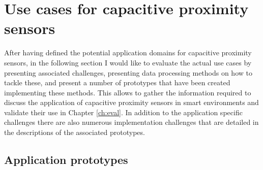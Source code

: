 \chapter{Use cases for capacitive proximity sensors}
\label{ch:usecases}
After having defined the potential application domains for capacitive proximity sensors, in the following section I would like to evaluate the actual use cases by presenting associated challenges, presenting data processing methods on how to tackle these, and present a number of prototypes that have been created implementing these methods. This allows to gather the information required to discuss the application of capacitive proximity sensors in smart environments and validate their use in Chapter \ref{ch:eval}. In addition to the application specific challenges there are also numerous implementation challenges that are detailed in the descriptions of the associated prototypes.


\clearpage
\section{Application prototypes}

\clearpage

\clearpage

\clearpage

\clearpage

\clearpage

\clearpage
